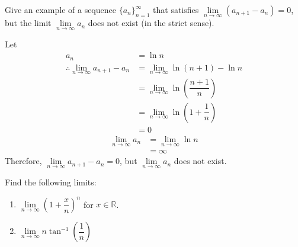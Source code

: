 \documentclass[fleqn, a4paper, 12pt, oneside]{amsart}
\theoremstyle{definition}
\theoremstyle{theorem}
\begin{document}
\begin{question}
	Give an example of a sequence $\{a_n\}_{n = 1}^{\infty}$ that satisfies $\lim\limits_{n \to \infty} (a_{n + 1} - a_n) = 0$, but the limit $\lim\limits_{n \to \infty} a_n$ does not exist (in the strict sense).
\end{question}

\begin{solution}
	Let
	\begin{align*}
		a_n &= \ln n\\
		\therefore \lim\limits_{n \to \infty} a_{n + 1} - a_n &= \lim\limits_{n \to \infty} \ln (n + 1) - \ln n\\
		&= \lim\limits_{n \to \infty} \ln \left( \dfrac{n + 1}{n} \right)\\
		&= \lim\limits_{n \to \infty} \ln \left( 1 + \dfrac{1}{n} \right)\\
		&= 0
	\end{align*}
	\begin{align*}
		\lim\limits_{n \to \infty} a_n &= \lim\limits_{n \to \infty} \ln n\\
		&= \infty
	\end{align*}
	Therefore, $\lim\limits_{n \to \infty} a_{n + 1} - a_n = 0$, but $\lim\limits_{n \to \infty} a_n$ does not exist.
\end{solution}

\begin{question}
	Find the following limits:
	\begin{enumerate}[leftmargin=*]
		\item $\lim\limits_{n \to \infty} \left( 1 + \dfrac{x}{n} \right)^n$ for $x \in \mathbb{R}$.
		\item $\lim\limits_{n \to \infty} n \tan^{-1} \left( \dfrac{1}{n} \right)$
	\end{enumerate}
\end{question}
\end{document}
